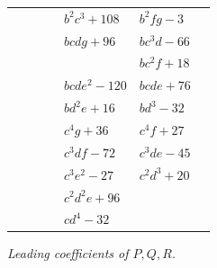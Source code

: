 \documentclass[11pt,a4paper]{article}
\begin{document}
\begin{tabular}{|l|l|l|l|l|l|l|}
 & & & & $b^{2}c^{3}+108$ & $b^{2}fg-3$ & \\
 & & & & $bcdg+96$ & $bc^{3}d-66$ & \\
 & & & & & $bc^{2}f+18$ & \\
 & & & & $bcde^{2}-120$ & $bcde+76$ & \\
 & & & & $bd^{2}e+16$ & $bd^{3}-32$ & \\
 & & & & $c^{4}g+36$ & $c^{4}f+27$ & \\
 & & & & $c^{3}df-72$ & $c^{3}de-45$ & \\
 & & & & $c^{3}e^{2}-27$ & $c^{2}d^{3}+20$ & \\
 & & & & $c^{2}d^{2}e+96$ & & \\
 & & & & $cd^{4}-32$ & & \\
\hline
\end{tabular}

\newpage
\begin{center}
\textit{Leading coefficients of $P,Q,R$.}
\end{center}
\end{document}
